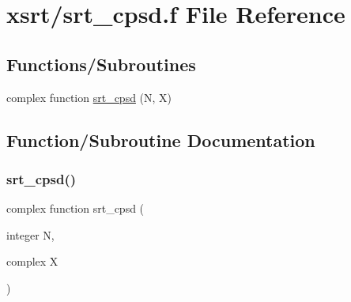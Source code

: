 \hypertarget{srt__cpsd_8f}{}\section{xsrt/srt\+\_\+cpsd.f File Reference}
\label{srt__cpsd_8f}
\subsection*{Functions/\+Subroutines}
\begin{DoxyCompactItemize}
\item 
complex function \hyperlink{srt__cpsd_8f_af6ebd551950a5c02767bd3a36ff86cbf}{srt\+\_\+cpsd} (N, X)
\end{DoxyCompactItemize}


\subsection{Function/\+Subroutine Documentation}
\mbox{\label{srt__cpsd_8f_af6ebd551950a5c02767bd3a36ff86cbf}} 
\subsubsection{\texorpdfstring{srt\+\_\+cpsd()}{srt\_cpsd()}}
{\footnotesize\ttfamily complex function srt\+\_\+cpsd (\begin{DoxyParamCaption}\item[{integer}]{N,  }\item[{complex}]{X }\end{DoxyParamCaption})}

